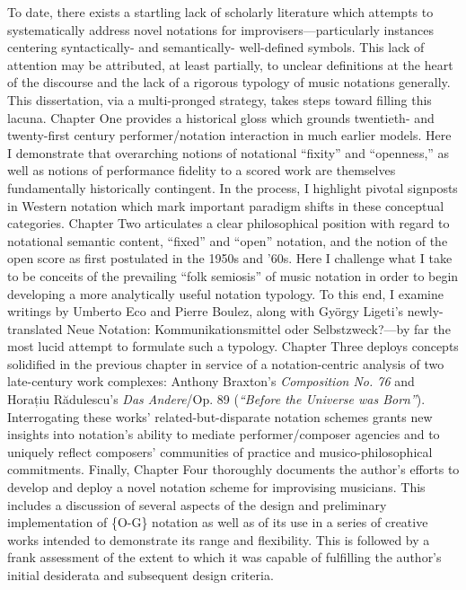 {
To date, there exists a startling lack of scholarly literature which attempts to systematically address novel notations for improvisers---particularly instances centering syntactically- and semantically- well-defined symbols. This lack of attention may be attributed, at least partially, to unclear definitions at the heart of the discourse and the lack of a rigorous typology of music notations generally. This dissertation, via a multi-pronged strategy, takes steps toward filling this lacuna. Chapter One provides a historical gloss which grounds twentieth- and twenty-first century performer/notation interaction in much earlier models. Here I demonstrate that overarching notions of notational ``fixity'' and ``openness,'' as well as notions of performance fidelity to a scored work are themselves fundamentally historically contingent. In the process, I highlight pivotal signposts in Western notation which mark important paradigm shifts in these conceptual categories. Chapter Two articulates a clear philosophical position with regard to notational semantic content, ``fixed'' and ``open'' notation, and the notion of the open score as first postulated in the 1950s and '60s. Here I challenge what I take to be conceits of the prevailing ``folk semiosis'' of music notation in order to begin developing a more analytically useful notation typology. To this end, I examine writings by Umberto Eco and Pierre Boulez, along with Gy\"{o}rgy Ligeti's newly-translated  \glqq Neue Notation: Kommunikationsmittel oder Selbstzweck?\grqq---by far the most lucid attempt to formulate such a typology.  Chapter Three deploys concepts solidified in the previous chapter in service of a notation-centric analysis of two late-century work complexes: Anthony Braxton's \textit{Composition No. 76} and Horațiu Rădulescu's \textit{Das Andere}/Op. 89 (\textit{``Before the Universe was Born''}). Interrogating these works' related-but-disparate notation schemes grants new insights into notation's ability to mediate performer/composer agencies and to uniquely reflect composers' communities of practice and musico-philosophical commitments. Finally, Chapter Four thoroughly documents the author's efforts to develop and deploy a novel notation scheme for improvising musicians. This includes a discussion of several aspects of the design and preliminary implementation of \{O-G\} notation as well as of its use in a series of creative works intended to demonstrate its range and flexibility. This is followed by a frank assessment of the extent to which it was capable of fulfilling the author's initial desiderata and subsequent design criteria.
}


